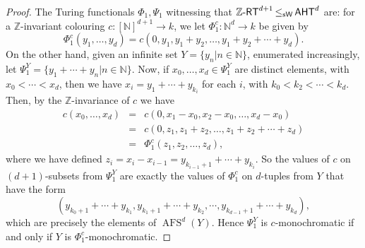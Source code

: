 \documentclass[11pt]{amsart}
\newcommand{\zrt}{\mathnormal{\mathbb Z\text{-}\mathsf{RT}}}
\newcommand{\aht}{\mathnormal{\mathsf{AHT}}}
\newcommand{\weisleq}{\mathop{\leq_{\mathrm{s}\mathsf{W}}}}
\DeclareMathOperator{\afs}{AFS}
\theoremstyle{definition}
\begin{document}
\begin{proof}
The Turing functionals $\Phi_1,\Psi_1$ witnessing that $\zrt^{d+1}\weisleq\aht^d$ are: for a $\mathbb Z$-invariant colouring $c:[\mathbb N]^{d+1}\longrightarrow k$, we let $\Phi_1^c:\mathbb N^d\longrightarrow k$ be given by
\begin{equation*}
\Phi_1^c(y_1,\ldots,y_d)=c(0,y_1,y_1+y_2,\ldots,y_1+y_2+\cdots+y_d).
\end{equation*}
On the other hand, given an infinite set $Y=\{y_n\big|n\in\mathbb N\}$, enumerated increasingly, let $\Psi_1^Y=\{y_1+\cdots+y_n\big|n\in\mathbb N\}$. %
Now, if $x_0,\ldots,x_d\in\Psi_1^Y$ are distinct elements, with $x_0<\cdots<x_d$, then we have 
$x_i=y_1+\cdots+y_{k_i}$ for each $i$, with
$k_0<k_2<\cdots<k_d$. Then, by the $\mathbb Z$-invariance of $c$ we have
\begin{eqnarray*}
c(x_0,\ldots,x_d) & = & c(0,x_1-x_0,x_2-x_0,\ldots,x_d-x_0) \\
 & = & c(0,z_1,z_1+z_2,\ldots,z_1+z_2+\cdots+z_d) \\
 & = & \Phi_1^c(z_1,z_2,\ldots,z_d),
\end{eqnarray*}
where we have defined $z_i=x_i-x_{i-1}=y_{k_{i-1}+1}+\cdots+y_{k_i}$. So the values of $c$ on $(d+1)$-subsets from $\Psi_1^Y$ are exactly the values of $\Phi_1^c$ on $d$-tuples from $Y$ that have the form
\begin{equation*}
(y_{k_0+1}+\cdots+y_{k_1},y_{k_1+1}+\cdots+y_{k_2},\cdots,y_{k_{d-1}+1}+\cdots+y_{k_d}),
\end{equation*}
which are precisely the elements of $\afs^d(Y)$. Hence $\Psi_1^Y$ is $c$-monochromatic if and only if $Y$ is $\Phi_1^c$-monochromatic.


\end{proof}
\end{document}
